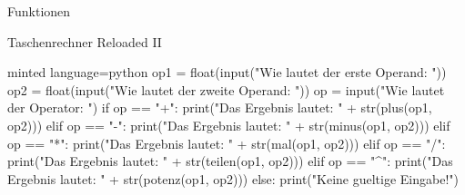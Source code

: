 \begin{task}[points=auto]{Funktionen}
\begin{subtask*}[points=0]{Taschenrechner Reloaded II }
\begin{solution}
\begin{codeBlock}[]{minted language=python}
                op1 = float(input("Wie lautet der erste Operand: "))
                op2 = float(input("Wie lautet der zweite Operand: "))
                op = input("Wie lautet der Operator: ")
                if op == "+":
                    print("Das Ergebnis lautet: " + str(plus(op1, op2)))
                elif op == "-":
                    print("Das Ergebnis lautet: " + str(minus(op1, op2)))
                elif op == "*":
                    print("Das Ergebnis lautet: " + str(mal(op1, op2)))
                elif op == "/":
                    print("Das Ergebnis lautet: " + str(teilen(op1, op2)))
                elif op == "^":
                    print("Das Ergebnis lautet: " + str(potenz(op1, op2)))
                else:
                    print("Keine gueltige Eingabe!")
            \end{codeBlock}
        \end{solution}
    \end{subtask*}
\end{task}
